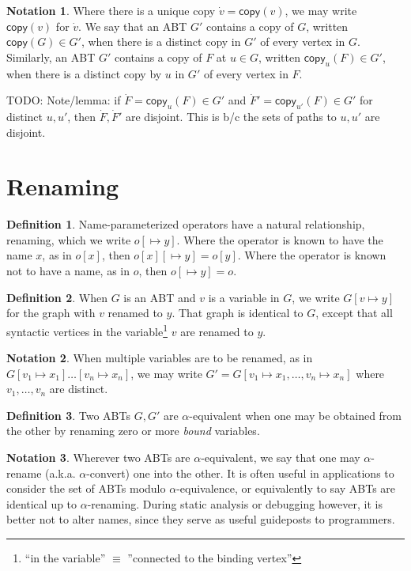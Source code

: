 \documentclass[11pt]{article} %
\theoremstyle{definition}
\newtheorem{dfn}{Definition}
\newtheorem*{ntn}{Notation}
\begin{document}
\begin{ntn}
Where there is a unique copy $\dot v = \mathsf{copy}(v)$, we may write $\mathsf{copy}(v)$ for $\dot v$.
We say that an ABT $G'$ contains a copy of $G$, written $\mathsf{copy}(G) \in G'$, when there is a distinct copy in $G'$ of every vertex in $G$.
Similarly, an ABT $G'$ contains a copy of $F$ at $u \in G$, written $\mathsf{copy}_u(F) \in G'$, when there is a distinct copy by $u$ in $G'$ of every vertex in $F$.
\end{ntn}

TODO: Note/lemma: if $\dot F = \mathsf{copy}_u(F) \in G'$ and $\dot F' = \mathsf{copy}_{u'}(F) \in G'$ for distinct $u,u'$, then $\dot F, \dot F'$ are disjoint.
This is b/c the sets of paths to $u, u'$ are disjoint.


\section{Renaming}

\begin{dfn}
Name-parameterized operators have a natural relationship, renaming, which we write $o[\mapsto y]$.
Where the operator is known to have the name $x$, as in $o[x]$, then $o[x][\mapsto y] = o[y]$.
Where the operator is known not to have a name, as in $o$, then $o[\mapsto y] = o$.
\end{dfn}

\begin{dfn}
When $G$ is an ABT and $v$ is a variable in $G$, we write $G[v \mapsto y]$ for the graph with $v$ renamed to $y$.
That graph is identical to $G$, except that all syntactic vertices in the variable\footnote{``in the variable'' $\equiv$ ''connected to the binding vertex''} $v$ are renamed to $y$.
\end{dfn}

\begin{ntn}
When multiple variables are to be renamed, as in $G[v_1 \mapsto x_1]\ldots[v_n \mapsto x_n]$, we may write $G' = G[v_1 \mapsto x_1, \ldots, v_n \mapsto x_n]$ where $v_1,\ldots,v_n$ are distinct.
\end{ntn}

\begin{dfn}
Two ABTs $G, G'$ are $\alpha$-equivalent when one may be obtained from the other by renaming zero or more \emph{bound} variables.
\end{dfn}

\begin{ntn}
Wherever two ABTs are $\alpha$-equivalent, we say that one may $\alpha$-rename (a.k.a. $\alpha$-convert) one into the other.
It is often useful in applications to consider the set of ABTs modulo $\alpha$-equivalence, or equivalently to say ABTs are identical up to $\alpha$-renaming.
During static analysis or debugging however, it is better not to alter names, since they serve as useful guideposts to programmers.
\end{ntn}
\end{document}
